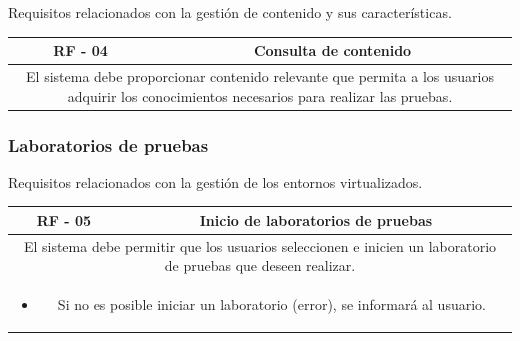                 Requisitos relacionados con la gestión de contenido y sus características.
                
                \begin{table}[!htbp]
                    \centering

                    \begin{tabular}{|c|c|}
                        \hline
                        \textbf{RF - 04} & \textbf{Consulta de contenido} \\
                        \hline
                        \multicolumn{2}{|p{15cm}|}{
                            El sistema debe proporcionar contenido relevante que permita a los usuarios adquirir los conocimientos necesarios para realizar las pruebas.
                        } \\
                        \hline
                    \end{tabular}

                    \label{tab:RF4}
                \end{table}
                
                \newpage
            
            \subsubsection{Laboratorios de pruebas}
            
                Requisitos relacionados con la gestión de los entornos virtualizados.
                
                \begin{table}[!htbp]
                    \centering

                    \begin{tabular}{|c|c|}
                        \hline
                        \textbf{RF - 05} & \textbf{Inicio de laboratorios de pruebas} \\
                        \hline
                        \multicolumn{2}{|p{15cm}|}{
                            El sistema debe permitir que los usuarios seleccionen e inicien un laboratorio de pruebas que deseen realizar.
                        } \\
                        \hline
                        \multicolumn{2}{|p{15cm}|}{
                            \begin{itemize}
                                \item Si no es posible iniciar un laboratorio (error), se informará al usuario.
                            \end{itemize}
                            } \\
                        \hline
                    \end{tabular}

                    \label{tab:RF5}
                \end{table}
                
